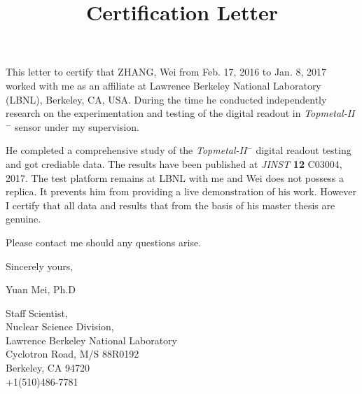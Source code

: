 \documentclass[a4paper,20pt]{article}
\title{\Huge \textbf{Certification Letter}}
\date{}
\begin{document}
\begin{spacing}{1.25}   
\maketitle

\LARGE \setlength\parindent{2em} This letter to certify that ZHANG, Wei from Feb. 17, 2016 to Jan. 8, 2017 worked with me as an affiliate at Lawrence Berkeley National Laboratory (LBNL), Berkeley, CA, USA. During the time he conducted independently research on the experimentation and testing of the digital readout in \emph{Topmetal-II$^-$} sensor under my supervision. 

\LARGE He completed a comprehensive study of the \emph{Topmetal-II$^-$} digital readout testing and got crediable data.  The results have been published at \emph{JINST} \textbf{12} C03004, 2017. The test platform remains at LBNL with me and Wei does not possess a replica. It prevents him from providing a live demonstration of his work. However I certify that all data and results that from the basis of his master thesis are genuine. 

\LARGE Please contact me should any questions arise.
\setlength\parskip{\baselineskip}

\noindent Sincerely yours,

\noindent Yuan Mei, Ph.D  

\noindent Staff Scientist,\\
\noindent Nuclear Science Division,\\
\noindent Lawrence Berkeley National Laboratory\\
 Cyclotron Road, M/S 88R0192\\
\noindent Berkeley, CA 94720\\
\noindent +1(510)486-7781\\
\end{spacing}
\end{document}
